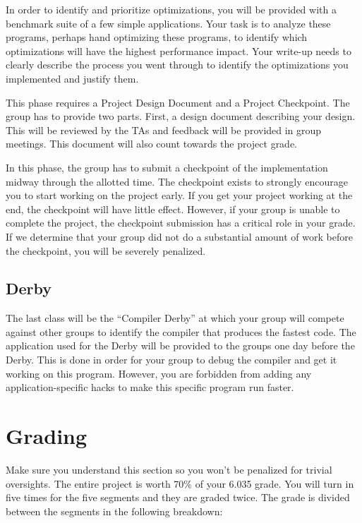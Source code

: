 \documentclass[11pt]{article}
\begin{document}
In order to identify and prioritize optimizations, you will be provided with a benchmark suite of a few simple applications.
Your task is to analyze these programs, perhaps hand optimizing these programs, to identify which optimizations will have the highest performance impact.
Your write-up needs to clearly describe the process you went through to identify the optimizations you implemented and justify them.


This phase requires a Project Design Document and a Project Checkpoint.
The group has to provide two parts.
First, a design document describing your design.
This will be reviewed by the TAs and feedback will be provided in group meetings.
This document will also count towards the project grade.

In this phase, the group has to submit a checkpoint of the implementation midway through the allotted time.
The checkpoint exists to strongly encourage you to start working on the project early.
If you get your project working at the end, the checkpoint will have little effect.
However, if your group is unable to complete the project, the checkpoint submission has a critical role in your grade.
If we determine that your group did not do a substantial amount of work before the checkpoint, you will be severely penalized.


\subsection{Derby}

The last class will be the ``Compiler Derby'' at which your group will compete against other groups to identify the compiler that produces the fastest code.
The application used for the Derby will be provided to the groups one day before the Derby.
This is done in order for your group to debug the compiler and get it working on this program.
However, you are forbidden from adding any application-specific hacks to make this specific program run faster.


\section{Grading}

Make sure you understand this section so you won't be penalized for trivial oversights.
The entire project is worth 70\% of your 6.035 grade.
You will turn in five times for the five segments and they are graded twice.
The grade is divided between the segments in the following breakdown:
\end{document}
